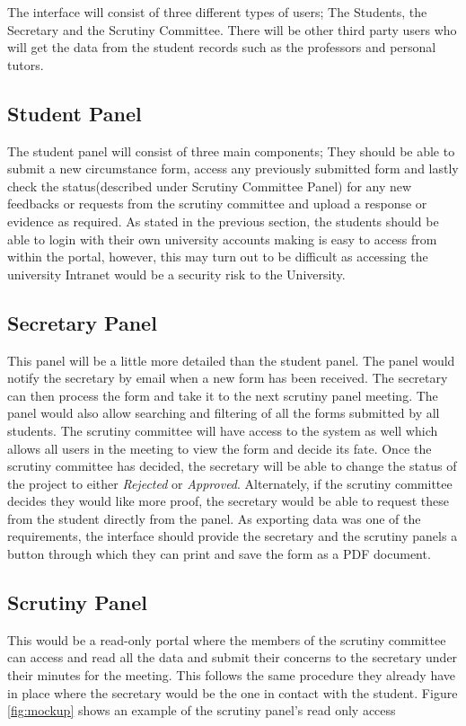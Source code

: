 \documentclass[../main.tex]{subfiles}
\begin{document}
\raggedright
The interface will consist of three different types of users; The Students, the Secretary and the Scrutiny Committee. There will be other third party users who will get the data from the student records such as the professors and personal tutors. 

\subsection{Student Panel}
The student panel will consist of three main components; They should be able to submit a new circumstance form, access any previously submitted form and lastly check the status(described under Scrutiny Committee Panel) for any new feedbacks or requests from the scrutiny committee and upload a response or evidence as required. As stated in the previous section, the students should be able to login with their own university accounts making is easy to access from within the portal, however, this may turn out to be difficult as accessing the university Intranet would be a security risk to the University.

\subsection{Secretary Panel}
This panel will be a little more detailed than the student panel. The panel would notify the secretary by email when a new form has been received. The secretary can then process the form and take it to the next scrutiny panel meeting. The panel would also allow searching and filtering of all the forms submitted by all students. The scrutiny committee will have access to the system as well which allows all users in the meeting to view the form and decide its fate. Once the scrutiny committee has decided, the secretary will be able to change the status of the project to either \textit{Rejected} or \textit{Approved}. Alternately, if the scrutiny committee decides they would like more proof, the secretary would be able to request these from the student directly from the panel. As exporting data was one of the requirements, the interface should provide the secretary and the scrutiny panels a button through which they can print and save the form as a PDF document. 

\subsection{Scrutiny Panel}
This would be a read-only portal where the members of the scrutiny committee can access and read all the data and submit their concerns to the secretary under their minutes for the meeting. This follows the same procedure they already have in place where the secretary would be the one in contact with the student. Figure \ref{fig:mockup} shows an example of the scrutiny panel's read only access
\end{document}
